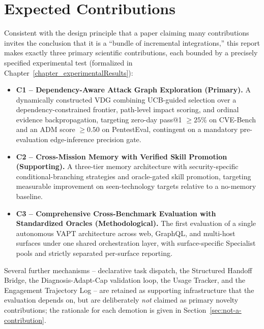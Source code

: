 \section{Expected Contributions}
\label{sec:intro_contributions}
\label{sec:not-a-contribution}

Consistent with the design principle that a paper claiming many contributions invites the conclusion that it is a ``bundle of incremental integrations,'' this report makes exactly three primary scientific contributions, each bounded by a precisely specified experimental test (formalized in Chapter~\ref{chapter_experimentalResults}):

\begin{itemize}
    \item \textbf{C1 -- Dependency-Aware Attack Graph Exploration (Primary).} A dynamically constructed VDG combining UCB-guided selection over a dependency-constrained frontier, path-level impact scoring, and ordinal evidence backpropagation, targeting zero-day pass@1 $\geq 25\%$ on CVE-Bench and an ADM score $\geq 0.50$ on PentestEval, contingent on a mandatory pre-evaluation edge-inference precision gate.
    \item \textbf{C2 -- Cross-Mission Memory with Verified Skill Promotion (Supporting).} A three-tier memory architecture with security-specific conditional-branching strategies and oracle-gated skill promotion, targeting measurable improvement on seen-technology targets relative to a no-memory baseline.
    \item \textbf{C3 -- Comprehensive Cross-Benchmark Evaluation with Standardized Oracles (Methodological).} The first evaluation of a single autonomous VAPT architecture across web, GraphQL, and multi-host surfaces under one shared orchestration layer, with surface-specific Specialist pools and strictly separated per-surface reporting.
\end{itemize}

Several further mechanisms -- declarative task dispatch, the Structured Handoff Bridge, the Diagnosis-Adapt-Cap validation loop, the Usage Tracker, and the Engagement Trajectory Log -- are retained as supporting infrastructure that the evaluation depends on, but are deliberately \emph{not} claimed as primary novelty contributions; the rationale for each demotion is given in Section~\ref{sec:not-a-contribution}.
